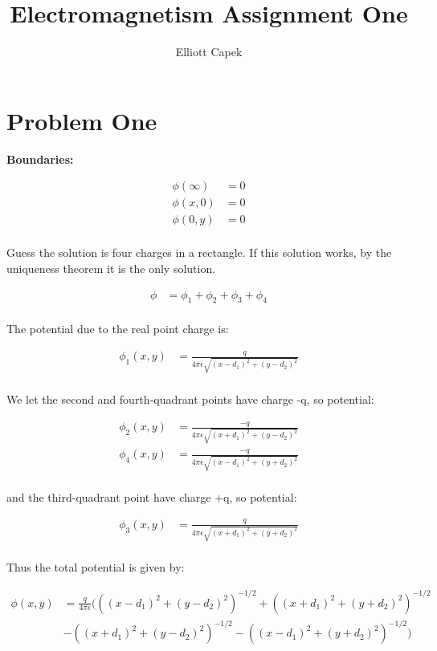\documentclass[10pt]{article} %
\title{Electromagnetism Assignment One}
\author{Elliott Capek}
\begin{document}
\maketitle{}

\section{Problem One}
\textbf{Boundaries:}

\begin{align*}
  \phi(\infty) &= 0\\
  \phi(x,0) &= 0\\
  \phi(0,y) &= 0\\
\end{align*}

Guess the solution is four charges in a rectangle. If this solution works, by the uniqueness theorem it is the only solution.

\begin{align*}
  \phi &= \phi_1 + \phi_2 + \phi_3 + \phi_4\\
\end{align*}

The potential due to the real point charge is:

\begin{align*}
  \phi_1(x,y) &= \frac{q}{4\pi\epsilon\sqrt{(x-d_1)^2+(y-d_2)^2}}\\
\end{align*}

We let the second and fourth-quadrant points have charge -q, so potential:

\begin{align*}
  \phi_2(x,y) &= \frac{-q}{4\pi\epsilon\sqrt{(x+d_1)^2+(y-d_2)^2}}\\
  \phi_4(x,y) &= \frac{-q}{4\pi\epsilon\sqrt{(x-d_1)^2+(y+d_2)^2}}\\
\end{align*}

and the third-quadrant point have charge +q, so potential:

\begin{align*}
  \phi_3(x,y) &= \frac{q}{4\pi\epsilon\sqrt{(x+d_1)^2+(y+d_2)^2}}\\
\end{align*}

Thus the total potential is given by:

\begin{align*}
  \phi(x,y) &= \frac{q}{4\pi\epsilon}\Big(
  \left((x-d_1)^2+(y-d_2)^2\right)^{-1/2} + \left((x+d_1)^2+(y+d_2)^2\right)^{-1/2}\\
  &-\left((x+d_1)^2+(y-d_2)^2\right)^{-1/2} - \left((x-d_1)^2+(y+d_2)^2\right)^{-1/2}\Big)
\end{align*}
\end{document}
